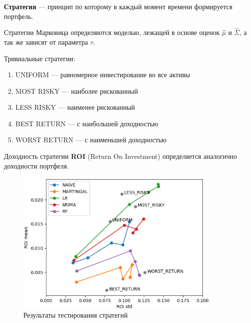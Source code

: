 \documentclass{beamer}
\begin{document}
\begin{frame}
    \frametitle{}
    \textbf{Стратегия} --- принцип по которому в каждый момент времени формируется портфель.

    Стратегии Марковица определяются моделью, лежащей в основе оценок $\hat{\mu}$ и $\hat{\Sigma}$,
    а так же зависят от параметра $\tau$.
    
    Тривиальные стратегии:
    \begin{enumerate}
        \item UNIFORM --- равномерное инвестирование во все активы
        \item MOST RISKY --- наиболее рискованный
        \item LESS RISKY --- наименее рискованный
        \item BEST RETURN --- с наибольшей доходностью
        \item WORST RETURN --- с наименьшей доходностью
    \end{enumerate}

    Доходность стратегии \textbf{ROI} (Return On Investment) определяется аналогично доходности портфеля.
\end{frame} 

\begin{frame}
    \begin{figure}
        \centering
        \includegraphics[width=0.9\textwidth]{result_frontiers_cut.png}
        \caption{Результаты тестирования стратегий}
        \label{fig:result_frontier}
    \end{figure}
\end{frame}
\end{document}
